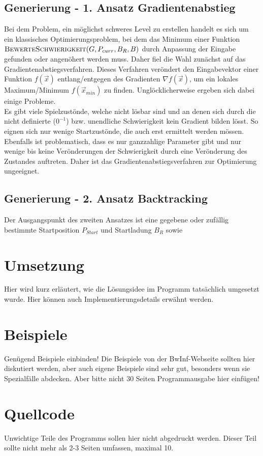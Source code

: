 \documentclass[a4paper,10pt,ngerman]{scrartcl}
\begin{document}
\subsection{Generierung - 1. Ansatz Gradientenabstieg}
Bei dem Problem, ein möglichst schweres Level zu erstellen handelt es sich um ein klassisches Optimierungsproblem, bei dem das Minimum einer Funktion $\textsc{BewerteSchwierigkeit}(G, P_{curr}, B_R,  B)$ durch Anpassung der Eingabe gefunden oder angenöhert werden muss. Daher fiel die Wahl zunächst auf das Gradientenabstiegsverfahren.
Dieses Verfahren veröndert den Eingabevektor einer Funktion $f(\vec{x})$ entlang/entgegen des Gradienten $\nabla f(\vec{x})$, um ein lokales Maximum/Minimum $f(\vec{x}_{min})$ zu finden. Unglöcklicherweise ergeben sich dabei einige Probleme. \\
Es gibt viele Spielzustönde, welche nicht lösbar sind und an denen sich durch die nicht definierte ($0^{-1}$) bzw. unendliche Schwierigkeit kein Gradient bilden lösst. So eignen sich nur wenige Startzustönde, die auch erst ermittelt werden mössen.
Ebenfalls ist problematisch, dass es nur ganzzahlige Parameter gibt und nur wenige bis keine Verönderungen der Schwierigkeit durch eine Verönderung des Zustandes auftreten. Daher ist das Gradientenabstiegsverfahren zur Optimierung ungeeignet.

\subsection{Generierung - 2. Ansatz Backtracking}
Der Ausgangspunkt des zweiten Ansatzes ist eine gegebene oder zufällig bestimmte Startposition $P_{Start}$ und Startladung $B_R$ sowie 

\section{Umsetzung}
Hier wird kurz erläutert, wie die Lösungsidee im Programm tatsächlich umgesetzt wurde. Hier können auch Implementierungsdetails erwähnt werden.

\section{Beispiele}
Genügend Beispiele einbinden! Die Beispiele von der BwInf-Webseite sollten hier diskutiert werden, aber auch eigene Beispiele sind sehr gut, besonders wenn sie Spezialfälle abdecken. Aber bitte nicht 30 Seiten Programmausgabe hier einfügen!

\section{Quellcode}
Unwichtige Teile des Programms sollen hier nicht abgedruckt werden. Dieser Teil sollte nicht mehr als 2-3 Seiten umfassen, maximal 10.
\end{document}

